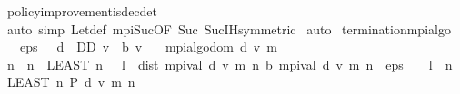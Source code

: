 \begin{isabellebody}
\ policy{\isacharunderscore}{\kern0pt}improvement{\isacharunderscore}{\kern0pt}is{\isacharunderscore}{\kern0pt}dec{\isacharunderscore}{\kern0pt}det\isanewline
\ \ \ \ \isamarkupfalse%
\ {\isacharparenleft}{\kern0pt}auto\ simp{\isacharcolon}{\kern0pt}\ Let{\isacharunderscore}{\kern0pt}def\ mpi{\isacharunderscore}{\kern0pt}Suc{\isacharprime}{\kern0pt}{\isacharbrackleft}{\kern0pt}OF\ Suc{\isacharparenleft}{\kern0pt}{}{\isacharparenright}{\kern0pt}{\isacharbrackright}{\kern0pt}\ Suc{\isachardot}{\kern0pt}IH{\isacharbrackleft}{\kern0pt}symmetric{\isacharbrackright}{\kern0pt}{\isacharparenright}{\kern0pt}\isanewline
{}\isamarkupfalse%
\ auto%
\endisatagproof
{\isafoldproof}%
%
\isadelimproof
\isanewline
%
\endisadelimproof
\isanewline
{}\isamarkupfalse%
\ termination{\isacharunderscore}{\kern0pt}mpi{\isacharunderscore}{\kern0pt}algo{\isacharcolon}{\kern0pt}\ \isanewline
\ \ \ {\isachardoublequoteopen}eps\ {\isachargreater}{\kern0pt}\ {}{\isachardoublequoteclose}\ {\isachardoublequoteopen}d\ {\isasymin}\ D\isactrlsub D{\isachardoublequoteclose}\ {\isachardoublequoteopen}v\ {\isasymle}\ {\isasymL}\isactrlsub b\ v{\isachardoublequoteclose}\isanewline
\ \ \ {\isachardoublequoteopen}mpi{\isacharunderscore}{\kern0pt}algo{\isacharunderscore}{\kern0pt}dom\ {\isacharparenleft}{\kern0pt}d{\isacharcomma}{\kern0pt}\ v{\isacharcomma}{\kern0pt}\ m{\isacharparenright}{\kern0pt}{\isachardoublequoteclose}\isanewline
%
\isadelimproof
%
\endisadelimproof
%
\isatagproof
{}\isamarkupfalse%
\ {\isacharminus}{\kern0pt}\isanewline
\ \ \isamarkupfalse%
\ n\ \ {\isachardoublequoteopen}n\ {\isacharequal}{\kern0pt}\ {\isacharparenleft}{\kern0pt}LEAST\ n{\isachardot}{\kern0pt}\ {}\ {\isacharasterisk}{\kern0pt}\ l\ {\isacharasterisk}{\kern0pt}\ dist\ {\isacharparenleft}{\kern0pt}mpi{\isacharunderscore}{\kern0pt}val\ d\ v\ m\ n{\isacharparenright}{\kern0pt}\ {\isacharparenleft}{\kern0pt}{\isasymL}\isactrlsub b\ {\isacharparenleft}{\kern0pt}mpi{\isacharunderscore}{\kern0pt}val\ d\ v\ m\ n{\isacharparenright}{\kern0pt}{\isacharparenright}{\kern0pt}\ {\isacharless}{\kern0pt}\ eps\ {\isacharasterisk}{\kern0pt}\ {\isacharparenleft}{\kern0pt}{}\ {\isacharminus}{\kern0pt}\ l{\isacharparenright}{\kern0pt}{\isacharparenright}{\kern0pt}{\isachardoublequoteclose}\ {\isacharparenleft}{\kern0pt}\ {\isachardoublequoteopen}n\ {\isacharequal}{\kern0pt}\ {\isacharparenleft}{\kern0pt}LEAST\ n{\isachardot}{\kern0pt}\ {\isacharquery}{\kern0pt}P\ d\ v\ m\ n{\isacharparenright}{\kern0pt}{\isachardoublequoteclose}{\isacharparenright}{\kern0pt}\isanewline

\end{isabellebody}
